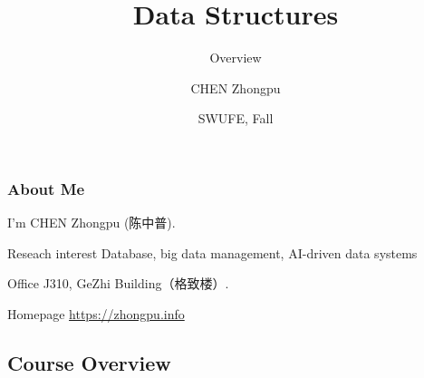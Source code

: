 \documentclass[aspectratio=169, 14pt]{beamer}
\title[Data Structures] %
{Data Structures}
\subtitle{Overview}
\author[CHEN Zhongpu] %
{CHEN Zhongpu}
\institute[] %
{
	School of Computing and Artificial Intelligence \\
	\href{mailto:zpchen@swufe.edu.cn}{zpchen@swufe.edu.cn}
}
\date[] %
{SWUFE, Fall \the\year{}}
\begin{document}
\frame{\titlepage}

\begin{frame}
	\frametitle{About Me}
	I'm CHEN Zhongpu (陈中普).

	\begin{block}{ Reseach interest}
		Database, big data management, AI-driven data systems
	\end{block}

	\begin{block}{ Office}
		J310, GeZhi Building（格致楼）.
	\end{block}

	\begin{block}{ Homepage}
		\href{https://zhongpu.info}{https://zhongpu.info}
	\end{block}

\end{frame}

{
\begin{frame}
	\section{\textcolor{darkmidnightblue}{Course Overview}}
\end{frame}

}

\end{document}
